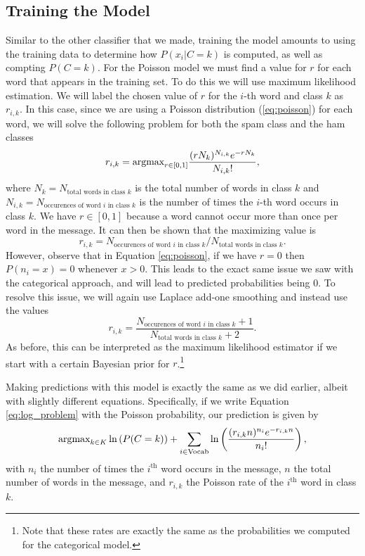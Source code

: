 \subsection*{Training the Model}
Similar to the other classifier that we made, training the model amounts to using the training data to determine how $P(x_i | C=k)$ is computed, as well as compting $P(C=k)$.
For the Poisson model we must find a value for $r$ for each word that appears in the training set.
To do this we will use maximum likelihood estimation.
We will label the chosen value of $r$ for the $i$-th word and class $k$ as $r_{i,k}$.
In this case, since we are using a Poisson distribution (\ref{eq:poisson}) for each word, we will solve the following problem for both the spam class and the ham classes
\begin{equation}\label{eq:MLE}
    r_{i,k} = \mbox{argmax}_{r\in[0,1]}\frac{(rN_k)^{N_{i,k}}e^{-rN_k}}{N_{i,k}!},
\end{equation}
where $N_k=N_\text{total words in class $k$}$ is the total number of words in class $k$ and $N_{i,k}=N_\text{occurences of word $i$ in class $k$}$ is the number of times the $i$-th word occurs in class $k$.
We have $r\in[0,1]$ because a word cannot occur more than once per word in the message.
It can then be shown that the maximizing value is
\[
r_{i,k} = N_\text{occurences of word $i$ in class $k$}
 / N_\text{total words in class $k$}.
\]
However, observe that in Equation \eqref{eq:poisson}, if we have $r=0$ then $P(n_i=x)=0$ whenever $x>0$.
This leads to the exact same issue we saw with the categorical approach, and will lead to predicted probabilities being 0.
To resolve this issue, we will again use Laplace add-one smoothing and instead use the values 
\begin{equation}\label{eq:normalized_r}
    r_{i,k} = \frac{N_\text{occurences of word $i$ in class $k$}+1}
{N_\text{total words in class $k$}+2}.
\end{equation}
As before, this can be interpreted as the maximum likelihood estimator if we start with a certain Bayesian prior for $r$.\footnote{Note that these rates are exactly the same as the probabilities we computed for the categorical model.}

Making predictions with this model is exactly the same as we did earlier, albeit with slightly different equations.
Specifically, if we write Equation \ref{eq:log_problem} with the Poisson probability, our prediction is given by
\begin{equation}\label{eq:poisson_prob}
\mbox{argmax}_{k\in K}\ln\left(P(C=k)\right) + 
\sum_{i\in\text{Vocab}}
\ln\left(\frac{(r_{i,k}n)^{n_i}e^{-r_{i,k}n}}{n_i!}\right),
\end{equation}
with $n_i$ the number of times the $i^{\text{th}}$ word occurs in the message, $n$ the total number of words in the message, and $r_{i,k}$ the Poisson rate of the $i^{\text{th}}$ word in class $k$.

